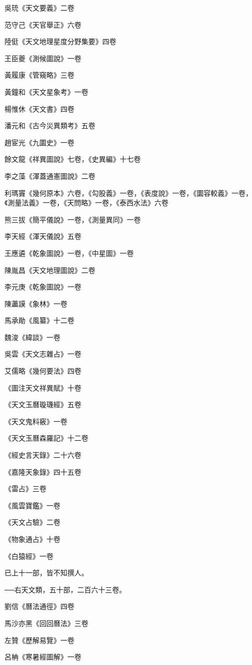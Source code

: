 吳珫《天文要義》二卷

范守己《天官舉正》六卷

陸侹《天文地理星度分野集要》四卷

王臣夔《測候圖說》一卷

黃履康《管窺略》三卷

黃鐘和《天文星象考》一卷

楊惟休《天文書》四卷

潘元和《古今災異類考》五卷

趙宦光《九圜史》一卷

餘文龍《祥異圖說》七卷，《史異編》十七卷

李之藻《渾蓋通憲圖說》二卷

利瑪竇《幾何原本》六卷，《勾股義》一卷，《表度說》一卷，《圜容較義》一卷，《測量法義》一卷，《天問略》一卷，《泰西水法》六卷

熊三拔《簡平儀說》一卷，《測量異同》一卷

李天經《渾天儀說》五卷

王應遴《乾象圖說》一卷，《中星圖》一卷

陳胤昌《天文地理圖說》二卷

李元庚《乾象圖說》一卷

陳藎謨《象林》一卷

馬承勛《風纂》十二卷

魏浚《緯談》一卷

吳雲《天文志雜占》一卷

艾儒略《幾何要法》四卷

《圖注天文祥異賦》十卷

《天文玉曆璇璣經》五卷

《天文鬼料竅》一卷

《天文玉曆森羅記》十二卷

《經史言天錄》二十六卷

《嘉隆天象錄》四十五卷

《雷占》三卷

《風雲寶鑑》一卷

《天文占驗》二卷

《物象通占》十卷

《白猿經》一卷

已上十一部，皆不知撰人。

──右天文類，五十部，二百六十三卷。

劉信《曆法通徑》四卷

馬沙亦黑《回回曆法》三卷

左贊《歷解易覽》一卷

呂柟《寒暑經圖解》一卷

